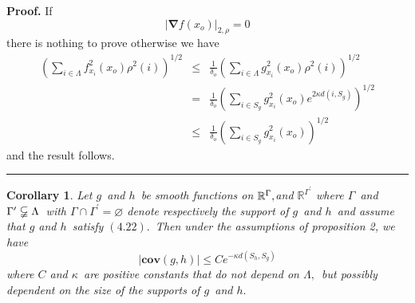 \documentclass{article}
\newtheorem{corollary}[theorem]{Corollary}
\newenvironment{proof}[1][Proof]{\noindent\textbf{#1.} }{\ \rule{0.5em}{0.5em}}
\begin{document}
\begin{proof}
If%
\begin{equation}
\left| \mathbf{\nabla }f(x_{o})\right| _{2,\rho }=0
\end{equation}%
there is nothing to prove otherwise we have 
\begin{eqnarray*}
\left( \sum_{i\in \Lambda }f_{x_{i}}^{2}(x_{o})\rho ^{2}(i)\right) ^{1/2}
&\leq &\frac{1}{\delta _{o}}\left( \sum_{i\in \Lambda
}g_{x_{i}}^{2}(x_{o})\rho ^{2}(i)\right) ^{1/2} \\
&=&\frac{1}{\delta _{o}}\left( \sum_{i\in
S_{g}}g_{x_{i}}^{2}(x_{o})e^{2\kappa d(i,S_{g})}\right) ^{1/2} \\
&\leq &\frac{1}{\delta _{o}}\left( \sum_{i\in
S_{g}}g_{x_{i}}^{2}(x_{o})\right) ^{1/2}
\end{eqnarray*}%
and the result follows.
\end{proof}

\begin{corollary}
\textit{Let }$g$\textit{\ and }$h$\textit{\ be smooth functions on }$\mathbb{%
R}^{\Gamma },$\textit{and }$\mathbb{R}^{\Gamma ^{\prime }}$ \textit{where }$%
\Gamma $\textit{\ and }$\Gamma ^{\prime }\varsubsetneqq \Lambda $\textit{\
with }$\Gamma \cap \Gamma ^{\prime }=\varnothing $ \textit{denote
respectively the support of }$g$\textit{\ and }$h$\textit{\ and assume that }%
$g$ \textit{and }$h$\textit{\ satisfy }$\left( 4.22\right) .$\textit{\ Then
under the assumptions of proposition 2, we have }%
\begin{equation}
\left| \mathbf{cov}(g,h)\right| \leq Ce^{-\kappa d(S_{h},S_{g})}
\end{equation}%
\textit{where }$C$ and $\kappa $\textit{\ are positive constants that do not
depend on }$\Lambda ,$\textit{\ but possibly dependent on the size of the
supports of }$g$\textit{\ and }$h.$
\end{corollary}
\end{document}
